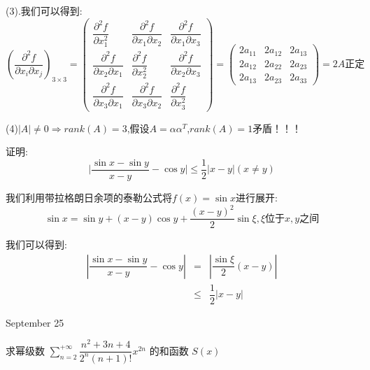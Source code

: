 \begin{solution}
(3).我们可以得到:  
$$\left( \dfrac{\partial^2 f}{\partial x_{i}\partial x_{j}}\right)_{3\times 3}=\left( \begin{matrix}
	\dfrac{\partial^2 f}{\partial x_{1}^2}&\dfrac{\partial^2 f}{\partial x_{1}\partial x_{2}}&\dfrac{\partial^2 f}{\partial x_{1}\partial x_{3}}\\
	\dfrac{\partial^2 f}{\partial x_{2}\partial x_{1}}&\dfrac{\partial^2 f}{\partial x_{2}^2}&\dfrac{\partial^2 f}{\partial x_{2}\partial x_{3}}\\
	\dfrac{\partial^2 f}{\partial x_{3}\partial x_{1}}&\dfrac{\partial^2 f}{\partial x_{3}\partial x_{2}}&\dfrac{\partial^2 f}{\partial x_{3}^2}
\end{matrix}\right)=\left( \begin{matrix}
2a_{11}&2a_{12}&2a_{13}\\
2a_{12}&2a_{22}&2a_{23}\\
2a_{13}&2a_{23}&2a_{33}
\end{matrix}\right)=2A\text{正定}$$

(4)$|A|\neq 0\Rightarrow rank(A)=3$,假设$A=\alpha\alpha^{T}$,$rank(A)=1$矛盾！！！
\end{solution}


\begin{example}[][Exam: 35.4.6]
	证明: $$\big|\dfrac{\sin x-\sin y}{x-y}-\cos y\big|\leq \dfrac{1}{2}\big|x-y\big| (x\neq y)$$
\end{example}

\begin{solution}

	我们利用带拉格朗日余项的泰勒公式将$f(x)=\sin x$进行展开:  
	$$\sin x=\sin y+(x-y)\cos y+\dfrac{(x-y)^2}{2}\sin\xi, \xi\text{位于}x,y\text{之间}$$
	
	我们可以得到:  
	\begin{eqnarray*}
		|\dfrac{\sin x-\sin y}{x-y}-\cos y|&=&|\dfrac{\sin\xi}{2}(x-y)|\\
		&\leq&\dfrac{1}{2}|x-y|
	\end{eqnarray*}
\end{solution}


\textcolor{purplea}{September 25}

\begin{example}[][Exam: 35.4.7]
	求幂级数 $\sum\limits_{n=2}^{+\infty}\dfrac{n^2+3n+4}{2^n(n+1)!}x^{2n}$ 的和函数 $S(x)$
\end{example}

